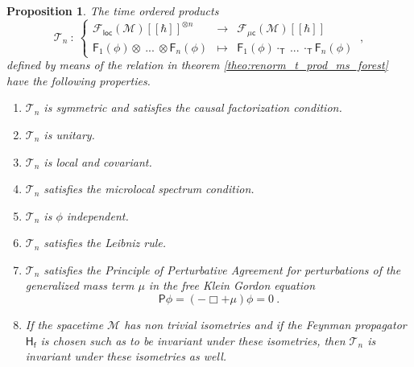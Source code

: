 \documentclass[11pt]{book}
\newcommand{\hilight}[1]{\colorbox{yellow!80!black}{#1}}
\newcommand{\loc}{\mathsf{loc}}
\newcommand{\muc}{\mu\csf}
\newcommand{\Fcal}{\mathcal{F}}
\newcommand{\Mcal}{\mathcal{M}}
\newcommand{\Tcal}{\mathcal{T}}
\newcommand{\Fsf}{\mathsf{F}}
\newcommand{\Hsf}{\mathsf{H}}
\newcommand{\Psf}{\mathsf{P}}
\newcommand{\Tsf}{\mathsf{T}}
\newcommand{\csf}{\mathsf{c}}
\newcommand{\fsf}{\mathsf{f}}
\theoremstyle{break}
\newtheorem{proposition}{Proposition}[chapter]
\begin{document}
\begin{proposition}\label{prop:properties_scheme} 
The time ordered products
%
\begin{equation*}
\Tcal_n \ : \ 
\left\{
\begin{array}{lcl}
\Fcal_{\loc}(\Mcal)[[\hbar]]^{\otimes n} & \to & \Fcal_{\muc}(\Mcal)[[\hbar]] \\
\Fsf_1(\phi) \otimes \ ... \ \otimes \Fsf_n(\phi) & \mapsto & \Fsf_1(\phi) \cdot_{\Tsf} \ ... \ \cdot_{\Tsf} \Fsf_n(\phi)
\end{array}
\right. \ ,
\end{equation*}
%
defined by means of the relation in theorem \ref{theo:renorm_t_prod_ms_forest} have the following properties.
%
\begin{enumerate}
%
\item\label{item:1_properties_scheme} $\Tcal_n$ is symmetric and satisfies the causal factorization condition.
%
\item\label{item:2_properties_scheme} $\Tcal_n$ is unitary.
%
\item\label{item:3_properties_scheme} $\Tcal_n$ is local and covariant.
%
\item\label{item:4_properties_scheme} $\Tcal_n$ satisfies the microlocal spectrum condition.
%
\item\label{item:5_properties_scheme} $\Tcal_n$ is $\phi$ independent.
%
\item\label{item:6_properties_scheme} \hilight{$\Tcal_n$ satisfies the Leibniz rule.}
%
\item\label{item:7_properties_scheme} $\Tcal_n$ satisfies the Principle of Perturbative Agreement for perturbations of the generalized mass term $\mu$ in the free Klein Gordon equation
%
\begin{equation*}
\Psf \phi = \left( - \Box + \mu \right) \phi = 0 \ . 
\end{equation*}
%
\item\label{item:8_properties_scheme} If the spacetime $\Mcal$ has non trivial isometries and if the Feynman propagator $\Hsf_\fsf$ is chosen such as to be invariant under these isometries, then $\Tcal_n$ is invariant under these isometries as well.
%
\end{enumerate}
%
\end{proposition}
\end{document}
